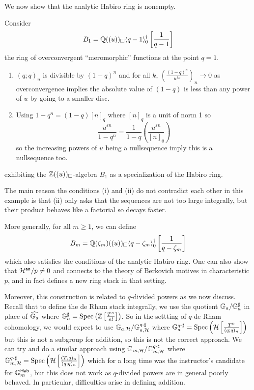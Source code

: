 We now show that the analytic Habiro ring is nonempty. 
\begin{example}
    Consider 
    $$B_{1}=\mathbb{Q}((u))_{\square}\langle q-1\rangle_{0}^{\dagger}\left[\frac{1}{q-1}\right]$$
    the ring of overconvergent ``meromorphic'' functions at the point $q=1$. 
    \begin{enumerate}[label=(\roman*)]
        \item $(q;q)_{n}$ is divisible by $(1-q)^{n}$ and for all $k$, $\left(\frac{(1-q)^{n}}{u^{kn}}\right)_{n}\to0$ as overconvergence implies the absolute value of $(1-q)$ is less than any power of $u$ by going to a smaller disc. 
        \item Using $1-q^{n}=(1-q)[n]_{q}$ where $[n]_{q}$ is a unit of norm 1 so 
        $$\frac{u^{\varepsilon n}}{1-q^{n}}=\frac{1}{1-q}\left(\frac{u^{\varepsilon n}}{[n]_{q}}\right)$$
        so the increasing powers of $u$ being a nullsequence imply this is a nullsequence too. 
    \end{enumerate}
    exhibiting the $\mathbb{Z}((u))_{\square}$-algebra $B_{1}$ as a specialization of the Habiro ring. 
\end{example}
\begin{remark}
    The main reason the conditions (i) and (ii) do not contradict each other in this example is that (ii) only asks that the sequences are not too large integrally, but their product behaves like a factorial so decays faster. 
\end{remark}
More generally, for all $m\geq 1$, we can define 
$$B_{m}=\mathbb{Q}(\zeta_{m})((u))_{\square}\langle q-\zeta_{m}\rangle_{0}^{\dagger}\left[\frac{1}{q-\zeta_{m}}\right]$$
which also satisfies the conditions of the analytic Habiro ring. One can also show that $\mathcal{H}^{\mathsf{an}}/p\neq0$ and connects to the theory of Berkovich motives in characteristic $p$, and in fact defines a new ring stack in that setting.  

Moreover, this construction is related to $q$-divided powers as we now discuss. Recall that to define the de Rham stack integrally, we use the quotient $\mathbb{G}_{a}/\mathbb{G}_{a}^{\sharp}$ in place of $\widehat{\mathbb{G}_{a}}$ where $\mathbb{G}_{a}^{\sharp}=\operatorname{Spec}\left(\mathbb{Z}\left[\frac{T^{n}}{n!}\right]\right)$. So in the settting of $q$-de Rham cohomology, we would expect to use $\mathbb{G}_{a,\mathcal{H}}/\mathbb{G}_{a,\mathcal{H}}^{q\text{-}\sharp}$ where $\mathbb{G}_{a}^{q\text{-}\sharp}=\operatorname{Spec}\left(\mathcal{H}\left[\frac{T^{n}}{(q;q)_{n}}\right]\right)$ but this is not a subgroup for addition, so this is not the correct approach. We can try and do a similar approach using $\mathbb{G}_{m,\mathcal{H}}/\mathbb{G}_{m,\mathcal{H}}^{q\text{-}\sharp}$ where $\mathbb{G}_{m,\mathcal{H}}^{q\text{-}\sharp}=\operatorname{Spec}\left(\mathcal{H}\left[\frac{(T,q)_{n}}{(q;q)_{n}}\right]\right)$ which for a long time was the instructor's candidate for $\mathbb{G}_{m}^{\mathsf{Hab}}$, but this does not work as $q$-divided powers are in general poorly behaved. In particular, difficulties arise in defining addition. 